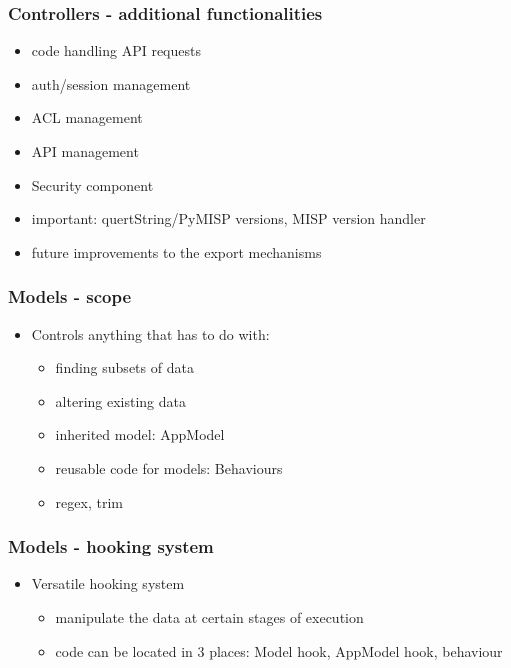 \begin{frame}
  \frametitle{Controllers - additional functionalities}
  \begin{itemize}
    \item code handling API requests
    \item auth/session management
    \item ACL management
    \item API management
    \item Security component
    \item important: quertString/PyMISP versions, MISP version handler
    \item future improvements to the export mechanisms
  \end{itemize}
\end{frame}

\begin{frame}
\frametitle{Models - scope}
\begin{itemize}
  \item Controls anything that has to do with:
    \begin{itemize}
    \item finding subsets of data
    \item altering existing data
    \item inherited model: AppModel
    \item reusable code for models: Behaviours
    \item regex, trim
    \end{itemize}
  \end{itemize}
\end{frame}

\begin{frame}
\frametitle{Models - hooking system}
  \begin{itemize}
    \item Versatile hooking system
    \begin{itemize}
      \item manipulate the data at certain stages of execution
      \item code can be located in 3 places: Model hook, AppModel hook, behaviour
    \end{itemize}
  \end{itemize}
\end{frame}

